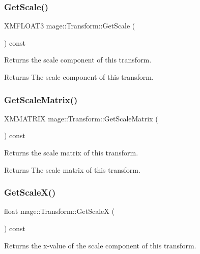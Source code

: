\subsubsection{\texorpdfstring{Get\+Scale()}{GetScale()}}
{\footnotesize\ttfamily X\+M\+F\+L\+O\+A\+T3 mage\+::\+Transform\+::\+Get\+Scale (\begin{DoxyParamCaption}{ }\end{DoxyParamCaption}) const}

Returns the scale component of this transform.

\begin{DoxyReturn}{Returns}
The scale component of this transform. 
\end{DoxyReturn}
\hypertarget{structmage_1_1_transform_ab78050be41abf1ab36d969d5235f97e2}{}\label{structmage_1_1_transform_ab78050be41abf1ab36d969d5235f97e2} 
\subsubsection{\texorpdfstring{Get\+Scale\+Matrix()}{GetScaleMatrix()}}
{\footnotesize\ttfamily X\+M\+M\+A\+T\+R\+IX mage\+::\+Transform\+::\+Get\+Scale\+Matrix (\begin{DoxyParamCaption}{ }\end{DoxyParamCaption}) const}

Returns the scale matrix of this transform.

\begin{DoxyReturn}{Returns}
The scale matrix of this transform. 
\end{DoxyReturn}
\hypertarget{structmage_1_1_transform_a3a82465d40dde6b98ca274a8de061545}{}\label{structmage_1_1_transform_a3a82465d40dde6b98ca274a8de061545} 
\subsubsection{\texorpdfstring{Get\+Scale\+X()}{GetScaleX()}}
{\footnotesize\ttfamily float mage\+::\+Transform\+::\+Get\+ScaleX (\begin{DoxyParamCaption}{ }\end{DoxyParamCaption}) const}

Returns the x-\/value of the scale component of this transform.

